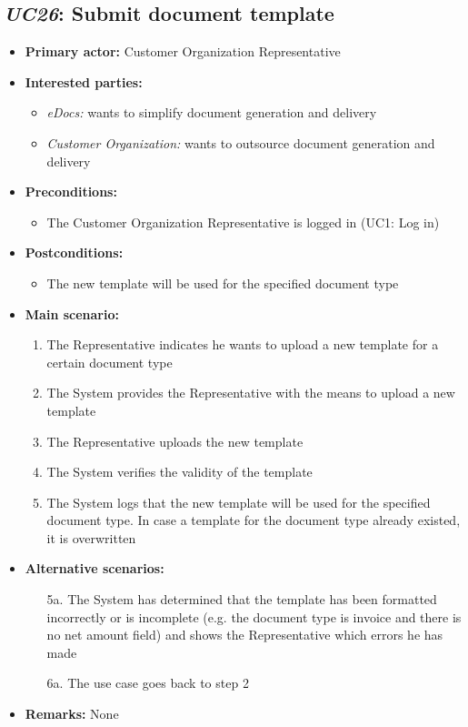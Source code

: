 \documentclass[a4paper,10pt]{article}
\begin{document}
\subsection{\emph{UC26}: Submit document template}
\begin{itemize}
	\item \textbf{Primary actor:} Customer Organization Representative
	\item \textbf{Interested parties:} 
	\begin{itemize}
		\item \textit{eDocs:} wants to simplify document generation and delivery
		\item \textit{Customer Organization:} wants to outsource document generation and delivery
	\end{itemize}
	
	\item \textbf{Preconditions:}
	\begin{itemize}
		\item The Customer Organization Representative is logged in (UC1: Log in)
	\end{itemize}
	
	\item \textbf{Postconditions:}
	\begin{itemize}
		\item The new template will be used for the specified document type
	\end{itemize}
	
	\item \textbf{Main scenario:} 
	\begin{enumerate}
		\item The Representative indicates he wants to upload a new template for a certain document type
		\item The System provides the Representative with the means to upload a new template
		\item The Representative uploads the new template
		\item The System verifies the validity of the template
		\item The System logs that the new template will be used for the specified document type. In case a template for the document type already existed, it is overwritten
	\end{enumerate}
	
	\item \textbf{Alternative scenarios:} 
	\begin{enumerate}
		\item [5a.] The System has determined that the template has been formatted incorrectly or is incomplete (e.g. the document type is invoice and there is no net amount field) and shows the Representative which errors he has made
		\item [6a.] The use case goes back to step 2
	\end{enumerate}
	
	\item \textbf{Remarks:}
	None
\end{itemize}
\end{document}
